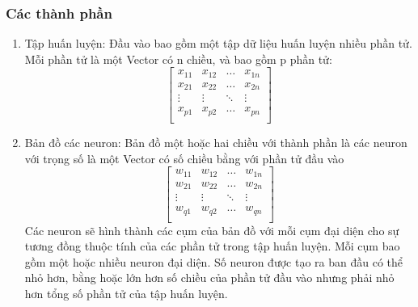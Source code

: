   \subsubsection{Các thành phần}
  \begin{enumerate}
    \item Tập huấn luyện: 
    Đầu vào bao gồm một tập dữ liệu huấn luyện nhiều phần tử. Mỗi phần tử là một
    Vector có n chiều, và bao gồm p phần tử:
    \[ 
    \begin{bmatrix}
    x_{11} & x_{12} & \dots & x_{1n}\\
    x_{21} & x_{22} & \dots & x_{2n}\\
    \vdots & \vdots & \ddots & \vdots\\
    x_{p1} & x_{p2} & \dots & x_{pn}\\
    \end{bmatrix}
     \]
     \item Bản đồ các neuron: 
     Bản đồ một hoặc hai chiều với thành phần là các neuron với trọng số là một
     Vector có số chiều bằng với phần tử đầu vào
     \[ 
     \begin{bmatrix}
    w_{11} & w_{12} & \dots & w_{1n}\\
    w_{21} & w_{22} & \dots & w_{2n}\\
    \vdots & \vdots & \ddots & \vdots\\
    w_{q1} & w_{q2} & \dots & w_{qn}\\
    \end{bmatrix}
      \]
      Các neuron sẽ hình thành các cụm của bản đồ với mỗi cụm đại diện cho sự tương đồng thuộc tính của các phần tử trong tập huấn luyện. Mỗi cụm bao gồm một hoặc nhiều neuron đại diện. Số neuron được tạo ra ban đầu có thể nhỏ hơn, bằng hoặc lớn hơn số chiều của phần tử đầu vào nhưng phải nhỏ hơn tổng số phần tử của tập huấn luyện.
     \end{enumerate}
